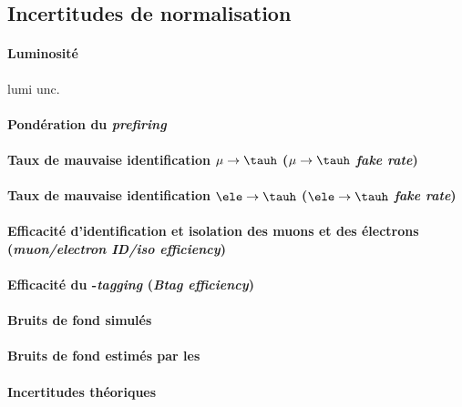 \subsection{Incertitudes de normalisation}\label{chapter-HTT_analysis-section-systematics-normalization}

\paragraph{Luminosité}
lumi unc.~\cite{LumiTwiki}

\paragraph{Pondération du \emph{prefiring}}

\paragraph{Taux de mauvaise identification $\mu\to\tauh$ (\emph{$\mu\to\tauh$ fake rate})}

\paragraph{Taux de mauvaise identification $\ele\to\tauh$ (\emph{$\ele\to\tauh$ fake rate})}

\paragraph{Efficacité d'identification et isolation des muons et des électrons (\emph{muon/electron ID/iso efficiency})}

\paragraph{Efficacité du \quarkb-\emph{tagging} (\emph{Btag efficiency})}

\paragraph{Bruits de fond simulés}

\paragraph{Bruits de fond estimés par les \fakefactors}

\paragraph{Incertitudes théoriques}
